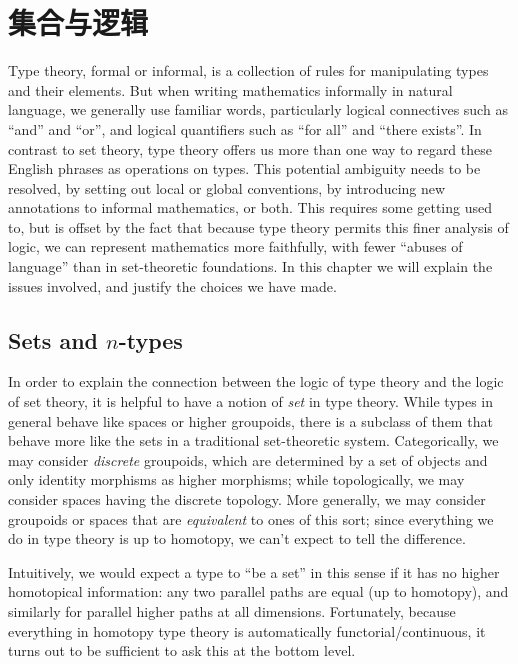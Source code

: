 \chapter{集合与逻辑}
\label{cha:logic}

Type theory, formal or informal, is a collection of rules for manipulating types and their elements.
But when writing mathematics informally in natural language, we generally use familiar words, particularly logical connectives such as ``and'' and ``or'', and logical quantifiers such as ``for all'' and ``there exists''.
In contrast to set theory, type theory offers us more than one way to regard these English phrases as operations on types.
This potential ambiguity needs to be resolved, by setting out local or global conventions, by introducing new annotations to informal mathematics, or both.
This requires some getting used to, but is offset by the fact that because type theory permits this finer analysis of logic, we can represent mathematics more faithfully, with fewer ``abuses of language'' than in set-theoretic foundations.
In this chapter we will explain the issues involved, and justify the choices we have made.

\section{Sets and \texorpdfstring{$n$}{n}-types}
\label{sec:basics-sets}

%

In order to explain the connection between the logic of type theory and the logic of set theory, it is helpful to have a notion of \emph{set} in type theory.
While types in general behave like spaces or higher groupoids, there is a subclass of them that behave more like the sets in a traditional set-theoretic system.
Categorically, we may consider \emph{discrete} groupoids, which are determined by a set of objects and only identity morphisms as higher morphisms; while topologically, we may consider spaces having the discrete topology.
More generally, we may consider groupoids or spaces that are \emph{equivalent} to ones of this sort; since everything we do in type theory is up to homotopy, we can't expect to tell the difference.

Intuitively, we would expect a type to ``be a set'' in this sense if it has no higher homotopical information: any two parallel paths are equal (up to homotopy), and similarly for parallel higher paths at all dimensions.
Fortunately, because everything in homotopy type theory is automatically functorial/continuous,
%
%
it turns out to be sufficient to ask this at the bottom level.

